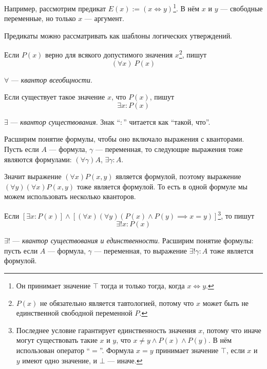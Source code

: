 Например, рассмотрим предикат ${E(x):=(x\iff y)}$\footnote{Он принимает
	значение $\top$ тогда и только тогда, когда $x\iff y$.}. В нём
$x$ и $y$ --- свободные переменные, но только
$x$ --- аргумент.

Предикаты можно рассматривать как шаблоны логических утверждений.

Если $P(x)$ верно для всякого допустимого значения $x$\footnote{$P(x)$ не обязательно
	является тавтологией, потому что $x$ может быть не единственной
	свободной переменной $P$.}, пишут
\[
	(\forall x)~P(x)
\]

$\forall$ --- {\it квантор всеобщности}.

\pagebreak

Если существует такое значение $x$, что $P(x)$, пишут
\[
	\exists x:P(x)
\]

$\exists$ --- {\it квантор существования}. Знак ``$:$'' читается как ``такой, что''.

Расширим понятие формулы, чтобы оно включало выражения с кванторами.
Пусть если $A$ --- формула, $\gamma$ --- переменная,
то следующие выражения тоже являются формулами:
$(\forall \gamma)A$, ${\exists \gamma:A}$.

Значит выражение
$(\forall x)P(x,y)$ является формулой, поэтому выражение
$(\forall y)(\forall x)P(x,y)$ тоже является формулой.
То есть в одной формуле мы можем использовать несколько кванторов.

Если ${[\exists x:P(x)]\land[(\forall x)(\forall y)(P(x)
				\land P(y)\implies x=y)]}$\footnote{
	Последнее
	условие гарантирует единственность значения $x$, потому что иначе
	могут существовать такие $x$ и $y$, что $x\neq y\land P(x)\land P(y)$.
	В нём использован оператор ``$=$''.
	Формула $x=y$ принимает значение $\top$, если $x$ и $y$ имеют одно значение,
	и $\bot$ --- иначе.}, то пишут
\[
	\exists! x:P(x)
\]

$\exists!$ --- {\it квантор существования и единственности}. Расширим
понятие формулы: пусть если
$A$ --- формула, $\gamma$ --- переменная, то выражение ${\exists!\gamma: A}$
тоже является формулой.

